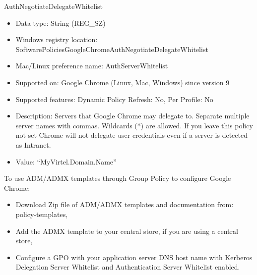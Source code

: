 \documentclass[letterpaper,10pt,english]{sphinxmanual}
\begin{document}
AuthNegotiateDelegateWhitelist
\begin{itemize}
\item {} 
Data type: String (REG\_SZ)

\item {} 
Windows registry location: SoftwarePoliciesGoogleChromeAuthNegotiateDelegateWhitelist

\item {} 
Mac/Linux preference name: AuthServerWhitelist

\item {} 
Supported on: Google Chrome (Linux, Mac, Windows) since version 9

\item {} 
Supported features: Dynamic Policy Refresh: No, Per Profile: No

\item {} 
Description: Servers that Google Chrome may delegate to. Separate multiple server names with commas. Wildcards (*) are allowed. If you leave this policy not set Chrome will not delegate user credentials even if a server is detected as Intranet.

\item {} 
Value: “MyVirtel.Domain.Name”

\end{itemize}

To use ADM/ADMX templates through Group Policy to configure Google Chrome:
\begin{itemize}
\item {} 
Download Zip file of ADM/ADMX templates and documentation from:  policy-templates,

\item {} 
Add the ADMX template to your central store, if you are using a central store,

\item {} 
Configure a GPO with your application server DNS host name with Kerberos Delegation Server Whitelist and Authentication Server Whitelist enabled.

\end{itemize}
\end{document}
